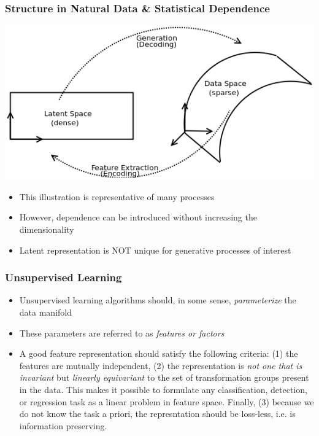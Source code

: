 \documentclass{beamer}
\begin{document}
\begin{frame} 
\frametitle{Structure in Natural Data \& Statistical Dependence}
\begin{center} 
\includegraphics[scale = 0.5]{./figures/spaces.png}
\end{center} 
\begin{itemize} 
\item This illustration is representative of many processes 
\item However, dependence can be introduced without increasing the dimensionality 
\item Latent representation is NOT unique for generative processes of interest
\end{itemize}  
\end{frame}

\begin{frame}
\frametitle{Unsupervised Learning} 
\begin{itemize}
\item Unsupervised learning algorithms should, in some sense, \emph{parameterize} the data manifold 
\item These parameters are referred to as \emph{features or factors} 
\item A good feature representation should satisfy the following criteria: (1) the features are mutually independent, (2) the representation is \emph{not one that is invariant} but \emph{linearly equivariant} to the set of transformation groups present in the data. This makes it possible to formulate any classification, detection, or regression task as a linear problem in feature space. Finally, (3) because we do not know the task a priori, the represntation should be loss-less, i.e. is information preserving.  
\end{itemize} 
\end{frame} 
\end{document}
